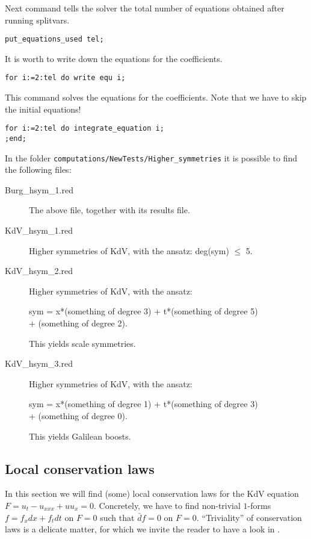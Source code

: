\documentclass[12pt]{amsart}
\theoremstyle{definition}
\begin{document}
Next command tells the solver the total number of equations obtained
after running splitvars.
\begin{verbatim}
put_equations_used tel;
\end{verbatim}

It is worth to write down the equations for the coefficients.
\begin{verbatim}
for i:=2:tel do write equ i;
\end{verbatim}

This command solves the equations for the coefficients.
Note that we have to skip the initial equations!
\begin{verbatim}
for i:=2:tel do integrate_equation i;
;end;
\end{verbatim}

In the folder \texttt{computations/NewTests/Higher\_symmetries} it is possible
to find the following files:
\begin{description}
\item[Burg\_hsym\_1.red] The above file, together with its results file.
  \item[KdV\_hsym\_1.red] Higher symmetries of KdV, with the ansatz:
    deg(sym) $\leq$ 5.
\item[KdV\_hsym\_2.red] Higher symmetries of KdV, with the ansatz:
  \begin{center}
    sym = x*(something of degree 3) + t*(something of degree  5)\\
  + (something of degree 2).
  \end{center}
    This yields scale symmetries.
\item[KdV\_hsym\_3.red] Higher symmetries of KdV, with the ansatz:
  \begin{center}
    sym = x*(something of degree 1) + t*(something of degree 3)\\
    + (something of degree 0).
  \end{center}
This yields Galilean boosts.
\end{description}

\subsection{Local conservation laws}
\label{sec:local-cons-laws}

In this section we will find (some) local conservation laws for the KdV
equation $F=u_t-u_{xxx}+uu_x=0$. Concretely, we have to find non-trivial $1$-forms
$f=f_xdx+f_tdt$ on $F=0$ such that $\bar d f=0$ on $F=0$. ``Triviality'' of
conservation laws is a delicate matter, for which we invite the reader to have
a look in \cite{Many}.
\end{document}
